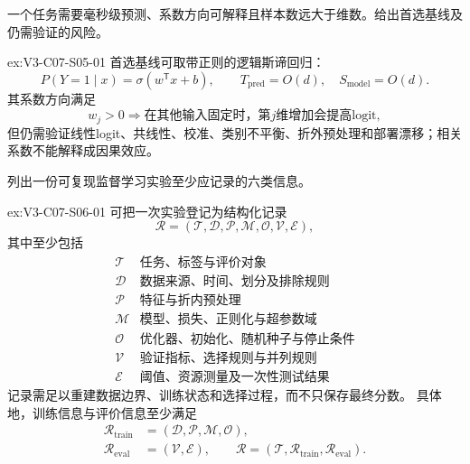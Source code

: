 \begin{SLChapterExercisePairSection}
\begin{exercise}\label{ex:V3-C07-S05-01}
一个任务需要毫秒级预测、系数方向可解释且样本数远大于维数。给出首选基线及仍需验证的风险。
\end{exercise}
\ifSLFullEdition
{}\label{sol:V3-C07-S05-01}
\begin{chapterexercisesolution}{ex:V3-C07-S05-01}
首选基线可取带正则的逻辑斯谛回归：
\[
P(Y=1\mid x)=\sigma(w^{\mathsf T}x+b),
\qquad
T_{\mathrm{pred}}=O(d),\quad S_{\mathrm{model}}=O(d).
\]
其系数方向满足
\[
w_j>0\Longrightarrow
\text{在其他输入固定时，第$j$维增加会提高logit},
\]
但仍需验证线性logit、共线性、校准、类别不平衡、折外预处理和部署漂移；相关系数不能解释成因果效应。
\end{chapterexercisesolution}
\fi

\begin{exercise}\label{ex:V3-C07-S06-01}
列出一份可复现监督学习实验至少应记录的六类信息。
\end{exercise}
\ifSLFullEdition
{}\label{sol:V3-C07-S06-01}
\begin{chapterexercisesolution}{ex:V3-C07-S06-01}
可把一次实验登记为结构化记录
\[
\mathcal R=(\mathcal T,\mathcal D,\mathcal P,\mathcal M,
\mathcal O,\mathcal V,\mathcal E),
\]
其中至少包括
\[
\begin{array}{c|l}
\mathcal T&\text{任务、标签与评价对象}\\
\mathcal D&\text{数据来源、时间、划分及排除规则}\\
\mathcal P&\text{特征与折内预处理}\\
\mathcal M&\text{模型、损失、正则化与超参数域}\\
\mathcal O&\text{优化器、初始化、随机种子与停止条件}\\
\mathcal V&\text{验证指标、选择规则与并列规则}\\
\mathcal E&\text{阈值、资源测量及一次性测试结果}
\end{array}
\]
记录需足以重建数据边界、训练状态和选择过程，而不只保存最终分数。
具体地，训练信息与评价信息至少满足
\[
\begin{aligned}
\mathcal R_{\mathrm{train}}
  &=(\mathcal D,\mathcal P,\mathcal M,\mathcal O),\\
\mathcal R_{\mathrm{eval}}
  &=(\mathcal V,\mathcal E),\qquad
\mathcal R=(\mathcal T,\mathcal R_{\mathrm{train}},\mathcal R_{\mathrm{eval}}).
\end{aligned}
\]
\end{chapterexercisesolution}
\fi

\end{SLChapterExercisePairSection}
